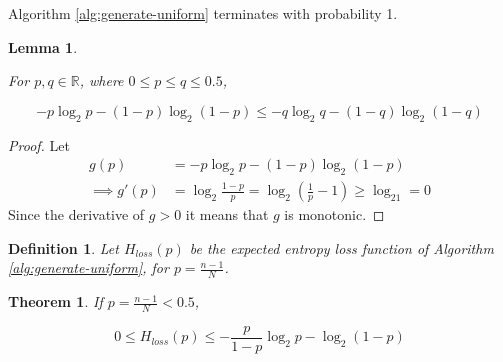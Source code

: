 \documentclass[12pt]{article}
\newtheorem{lemma}{Lemma}
\newtheorem{definition}{Definition}
\newtheorem{theorem}{Theorem}
\begin{document}
Algorithm \ref{alg:generate-uniform} terminates with probability 1.

\begin{lemma}
    \label{lem:shannon-inequality}

For $p,q \in \mathbb{R}$, where $0 \le p\le q \le 0.5$, 

\begin{equation}
-p\log_2 p - (1-p)\log_2(1-p) \le -q\log_2 q - (1-q)\log_2(1-q)
\end{equation}
\end{lemma}

\begin{proof}
    Let
    \begin{align}
        g(p) & = -p\log_2 p - (1-p)\log_2(1-p) \\
        \implies g'(p) & = \log_2\frac{1-p}{p} = \log_2(\frac{1}{p}-1) \ge \log_21 = 0 
    \end{align}
Since the derivative of $g>0$ it means that $g$ is monotonic.
\end{proof}

\begin{definition}
    Let $H_{loss}(p)$ be the expected entropy loss function of Algorithm \ref{alg:generate-uniform}, for $p=\frac{n-1}{N}$.
\end{definition}

\begin{theorem}
    \label{thm:loss}
If $p = \frac{n-1}{N} < 0.5$,

\begin{equation}
0 \le H_{loss}(p) \le -\frac{p}{1-p}\log_2p - \log_2(1-p)
\end{equation}

\end{theorem}
\end{document}
